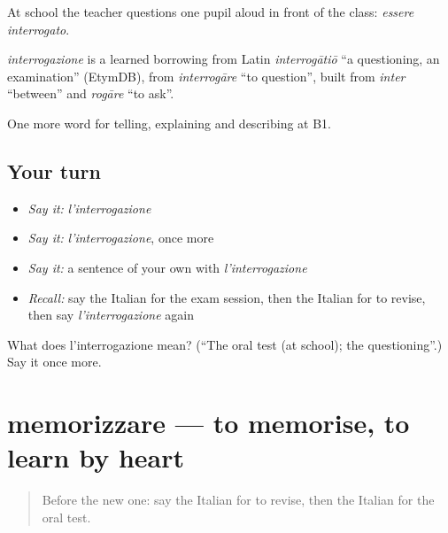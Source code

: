 At school the teacher questions one pupil aloud in front of the class: \emph{essere interrogato}.

\begin{cousinweb}
\emph{interrogazione} is a learned borrowing from Latin \emph{interrogātiō} \textquotedblleft{}a questioning, an examination\textquotedblright{} (EtymDB), from \emph{interrogāre} \textquotedblleft{}to question\textquotedblright{}, built from \emph{inter} \textquotedblleft{}between\textquotedblright{} and \emph{rogāre} \textquotedblleft{}to ask\textquotedblright{}.
\end{cousinweb}

\begin{grammarlens}[title={What you've built}]
One more word for telling, explaining and describing at B1.
\end{grammarlens}

\subsection*{Your turn}
\begin{itemize}
\raggedright
  \item \emph{Say it:} \emph{l'interrogazione}
  \item \emph{Say it:} \emph{l'interrogazione}, once more
  \item \emph{Say it:} a sentence of your own with \emph{l'interrogazione}
  \item \emph{Recall:} say the Italian for the exam session, then the Italian for to revise, then say \emph{l'interrogazione} again
\end{itemize}

\begin{tcolorbox}[breakable,colback=teal!4,colframe=teal!35!black,title={Before you move on}]
What does l'interrogazione mean? (\textquotedblleft{}The oral test (at school); the questioning\textquotedblright{}.) Say it once more.
\end{tcolorbox}
\section[memorizzare]{memorizzare — to memorise, to learn by heart}

\label{lesson:IT-C382-memorizzare}



\begin{quote}
Before the new one: say the Italian for to revise, then the Italian for the oral test.
\end{quote}

